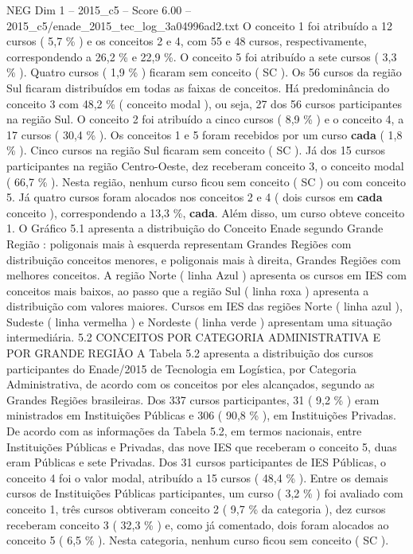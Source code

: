 \begin{textsample}{NEG Dim 1 – 2015\_c5 – Score 6.00 – 2015\_c5/enade\_2015\_tec\_log\_3a04996ad2.txt}
O conceito 1 foi atribuído a 12 cursos ( 5,7 \% ) e os conceitos 2 e 4, com 55 e 48 cursos, respectivamente, correspondendo a 26,2 \% e 22,9 \%.
O conceito 5 foi atribuído a sete cursos ( 3,3 \% ).
Quatro cursos ( 1,9 \% ) ficaram sem conceito ( SC ).
Os 56 cursos da região Sul ficaram distribuídos em todas as faixas de conceitos.
Há predominância do conceito 3 com 48,2 \% ( conceito modal ), ou seja, 27 dos 56 cursos participantes na região Sul.
O conceito 2 foi atribuído a cinco cursos ( 8,9 \% ) e o conceito 4, a 17 cursos ( 30,4 \% ).
Os conceitos 1 e 5 foram recebidos por um curso \textbf{cada} ( 1,8 \% ).
Cinco cursos na região Sul ficaram sem conceito ( SC ).
Já dos 15 cursos participantes na região Centro-Oeste, dez receberam conceito 3, o conceito modal ( 66,7 \% ).
Nesta região, nenhum curso ficou sem conceito ( SC ) ou com conceito 5.
Já quatro cursos foram alocados nos conceitos 2 e 4 ( dois cursos em \textbf{cada} conceito ), correspondendo a 13,3 \%, \textbf{cada}.
Além disso, um curso obteve conceito 1.
O Gráfico 5.1 apresenta a distribuição do Conceito Enade segundo Grande Região : poligonais mais à esquerda representam Grandes Regiões com distribuição conceitos menores, e poligonais mais à direita, Grandes Regiões com melhores conceitos.
A região Norte ( linha Azul ) apresenta os cursos em IES com conceitos mais baixos, ao passo que a região Sul ( linha roxa ) apresenta a distribuição com valores maiores.
Cursos em IES das regiões Norte ( linha azul ), Sudeste ( linha vermelha ) e Nordeste ( linha verde ) apresentam uma situação intermediária. 5.2 CONCEITOS POR CATEGORIA ADMINISTRATIVA E POR GRANDE REGIÃO A Tabela 5.2 apresenta a distribuição dos cursos participantes do Enade/2015 de Tecnologia em Logística, por Categoria Administrativa, de acordo com os conceitos por eles alcançados, segundo as Grandes Regiões brasileiras.
Dos 337 cursos participantes, 31 ( 9,2 \% ) eram ministrados em Instituições Públicas e 306 ( 90,8 \% ), em Instituições Privadas.
De acordo com as informações da Tabela 5.2, em termos nacionais, entre Instituições Públicas e Privadas, das nove IES que receberam o conceito 5, duas eram Públicas e sete Privadas.
Dos 31 cursos participantes de IES Públicas, o conceito 4 foi o valor modal, atribuído a 15 cursos ( 48,4 \% ).
Entre os demais cursos de Instituições Públicas participantes, um curso ( 3,2 \% ) foi avaliado com conceito 1, três cursos obtiveram conceito 2 ( 9,7 \% da categoria ), dez cursos receberam conceito 3 ( 32,3 \% ) e, como já comentado, dois foram alocados ao conceito 5 ( 6,5 \% ).
Nesta categoria, nenhum curso ficou sem conceito ( SC ).

\end{textsample}
